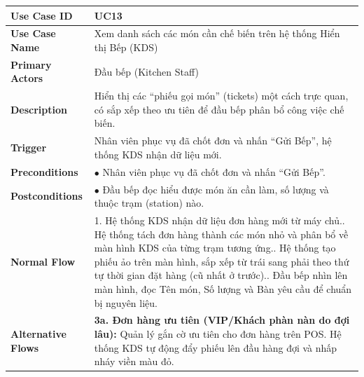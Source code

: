 \begin{longtable}{|p{3.5cm}|p{12.5cm}|}
\hline
\textbf{Use Case ID} & UC13 \\ \hline
\textbf{Use Case Name} & Xem danh sách các món cần chế biến trên hệ thống Hiển thị Bếp (KDS) \\ \hline
\textbf{Primary Actors} & Đầu bếp (Kitchen Staff) \\ \hline
\textbf{Description} & Hiển thị các ``phiếu gọi món'' (tickets) một cách trực quan, có sắp xếp theo ưu tiên để đầu bếp phân bổ công việc chế biến. \\ \hline
\textbf{Trigger} & Nhân viên phục vụ đã chốt đơn và nhấn ``Gửi Bếp'', hệ thống KDS nhận dữ liệu mới. \\ \hline
\textbf{Preconditions} & $\bullet$ Nhân viên phục vụ đã chốt đơn và nhấn ``Gửi Bếp''. \\ \hline
\textbf{Postconditions} & $\bullet$ Đầu bếp đọc hiểu được món ăn cần làm, số lượng và thuộc trạm (station) nào. \\ \hline
\textbf{Normal Flow} &
1. Hệ thống KDS nhận dữ liệu đơn hàng mới từ máy chủ.\newline
2. Hệ thống tách đơn hàng thành các món nhỏ và phân bổ về màn hình KDS của từng trạm tương ứng.\newline
3. Hệ thống tạo phiếu ảo trên màn hình, sắp xếp từ trái sang phải theo thứ tự thời gian đặt hàng (cũ nhất ở trước).\newline
4. Đầu bếp nhìn lên màn hình, đọc Tên món, Số lượng và Bàn yêu cầu để chuẩn bị nguyên liệu. \\ \hline
\textbf{Alternative Flows} &
\textbf{3a. Đơn hàng ưu tiên (VIP/Khách phàn nàn do đợi lâu):} Quản lý gắn cờ ưu tiên cho đơn hàng trên POS. Hệ thống KDS tự động đẩy phiếu lên đầu hàng đợi và nhấp nháy viền màu đỏ. \\ \hline
\end{longtable}

